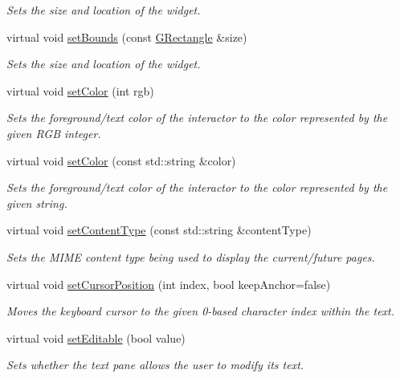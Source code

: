 \begin{DoxyCompactItemize}
\begin{DoxyCompactList}\small\item\em Sets the size and location of the widget. \end{DoxyCompactList}\item 
virtual void \mbox{\hyperlink{classGInteractor_acada386653f008cacc7cce86426bef7c}{set\+Bounds}} (const \mbox{\hyperlink{classGRectangle}{G\+Rectangle}} \&size)
\begin{DoxyCompactList}\small\item\em Sets the size and location of the widget. \end{DoxyCompactList}\item 
virtual void \mbox{\hyperlink{classGInteractor_ab1f5cc0f5cc6bbbd716a526c61f1081d}{set\+Color}} (int rgb)
\begin{DoxyCompactList}\small\item\em Sets the foreground/text color of the interactor to the color represented by the given R\+GB integer. \end{DoxyCompactList}\item 
virtual void \mbox{\hyperlink{classGInteractor_a61374df6c11b52cfbb0815decdbaebc6}{set\+Color}} (const std\+::string \&color)
\begin{DoxyCompactList}\small\item\em Sets the foreground/text color of the interactor to the color represented by the given string. \end{DoxyCompactList}\item 
virtual void \mbox{\hyperlink{classGBrowserPane_a0ba11f3ad4f6257759f0db3dd791e6a4}{set\+Content\+Type}} (const std\+::string \&content\+Type)
\begin{DoxyCompactList}\small\item\em Sets the M\+I\+ME content type being used to display the current/future pages. \end{DoxyCompactList}\item 
virtual void \mbox{\hyperlink{classGBrowserPane_a5817e10a86be5cd41b3668d8fccb10e0}{set\+Cursor\+Position}} (int index, bool keep\+Anchor=false)
\begin{DoxyCompactList}\small\item\em Moves the keyboard cursor to the given 0-\/based character index within the text. \end{DoxyCompactList}\item 
virtual void \mbox{\hyperlink{classGBrowserPane_a008d7fd44fb3e7a6886cdaddbc3644a2}{set\+Editable}} (bool value)
\begin{DoxyCompactList}\small\item\em Sets whether the text pane allows the user to modify its text. \end{DoxyCompactList}\item 

\end{DoxyCompactItemize}
